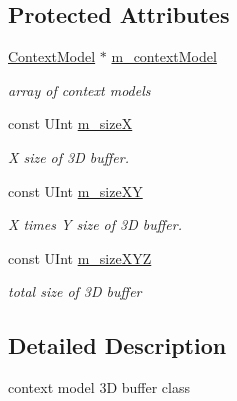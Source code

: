 \subsection*{Protected Attributes}
\begin{DoxyCompactItemize}
\item 
\mbox{\label{class_context_model3_d_buffer_a302c83d47ee3e91238f04639738d997c}} 
\hyperlink{class_context_model}{Context\+Model} $\ast$ \hyperlink{class_context_model3_d_buffer_a302c83d47ee3e91238f04639738d997c}{m\+\_\+context\+Model}
\begin{DoxyCompactList}\small\item\em array of context models \end{DoxyCompactList}\item 
\mbox{\label{class_context_model3_d_buffer_a6291577a0880fb9f839b9e27de1b47f9}} 
const U\+Int \hyperlink{class_context_model3_d_buffer_a6291577a0880fb9f839b9e27de1b47f9}{m\+\_\+sizeX}
\begin{DoxyCompactList}\small\item\em X size of 3D buffer. \end{DoxyCompactList}\item 
\mbox{\label{class_context_model3_d_buffer_a084e9fecdf5404bff4b1e209398a184a}} 
const U\+Int \hyperlink{class_context_model3_d_buffer_a084e9fecdf5404bff4b1e209398a184a}{m\+\_\+size\+XY}
\begin{DoxyCompactList}\small\item\em X times Y size of 3D buffer. \end{DoxyCompactList}\item 
\mbox{\label{class_context_model3_d_buffer_a93d3fd4bbab4de2d4727f9f717f32d0b}} 
const U\+Int \hyperlink{class_context_model3_d_buffer_a93d3fd4bbab4de2d4727f9f717f32d0b}{m\+\_\+size\+X\+YZ}
\begin{DoxyCompactList}\small\item\em total size of 3D buffer \end{DoxyCompactList}\end{DoxyCompactItemize}


\subsection{Detailed Description}
context model 3D buffer class 

